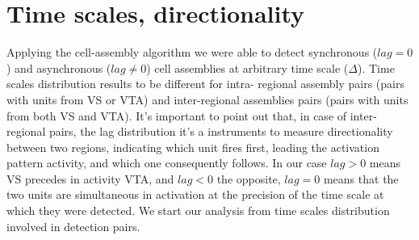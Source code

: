 \section{Time scales, directionality}
Applying the cell-assembly algorithm we were able to detect synchronous ($lag=0$) and asynchronous ($lag\neq 0$) cell assemblies at arbitrary time scale ($\Delta$). Time scales distribution results to be different for intra- regional assembly pairs (pairs with units from VS or VTA) and inter-regional assemblies pairs (pairs with units from both VS and VTA). It's important to point out that, in case of inter-regional pairs, the lag distribution it's a instruments to measure directionality between two regions, indicating which unit fires first, leading the activation pattern activity, and which one consequently follows. In our case $lag >0$ means VS precedes in activity VTA, and $lag <0$ the opposite, $lag=0$ means that the two units are  simultaneous in activation at the precision of the time scale at which they were detected.
We start our analysis from time scales distribution involved in detection pairs.
